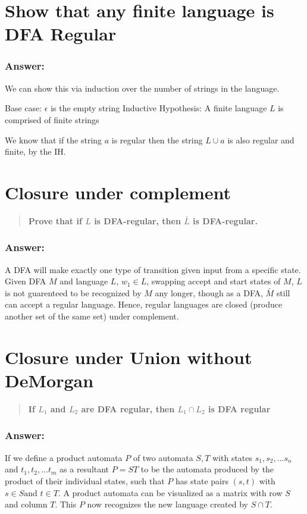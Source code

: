 \documentclass[titlepage]{article}\usepackage[]{graphicx}\usepackage[]{color}
\begin{document}
\section{Show that any finite language is DFA Regular}
\begin{quote}
  \textbf{ }
\end{quote}
\subsubsection{Answer:}
We can show this via induction over the number of strings in the language.

Base case: $\epsilon$ is the empty string
Inductive Hypothesis: A finite language $L$ is comprised of finite strings

We know that if the string ${a}$ is regular then the string $L \cup {a}$ is
also regular and finite, by the IH. 

\section{Closure under complement}
\begin{quote}
  \textbf{Prove that if $L$ is DFA-regular, then $\bar{L}$ is DFA-regular.}
\end{quote}
\subsubsection{Answer:}

A DFA will make exactly one type of transition given input from a specific
state. Given DFA $M$ and language $L$, $w_1 \in L$, swapping accept and start
states of $M$, $L$ is not guarenteed to be recognized by $M$ any longer, though
as a DFA, $\bar{M}$ still can accept a regular language. Hence, regular
languages are closed (produce another set of the same set) under complement. 


\section{Closure under Union without DeMorgan}
\begin{quote}
  \textbf{If $L_1$ and $L_2$ are DFA regular, then $L_1 \cap L_2$ is DFA
  regular}
\end{quote}
\subsubsection{Answer:}
If we define a product automata $P$ of two automata $S,T$ with states $s_1,
s_2, \dots s_n$ and $t_1, t_2, \dots t_m$  as a resultant $P = ST$
to be the automata produced by the product of their individual states, such
that $P$ has state pairs $(s, t) $ with $ s \in S \text{and } t \in T$. A
product automata can be visualized as a matrix with row $S$ and column $T$.
This $P$ now recognizes the new language created by $S \cap T$. 
\end{document}
